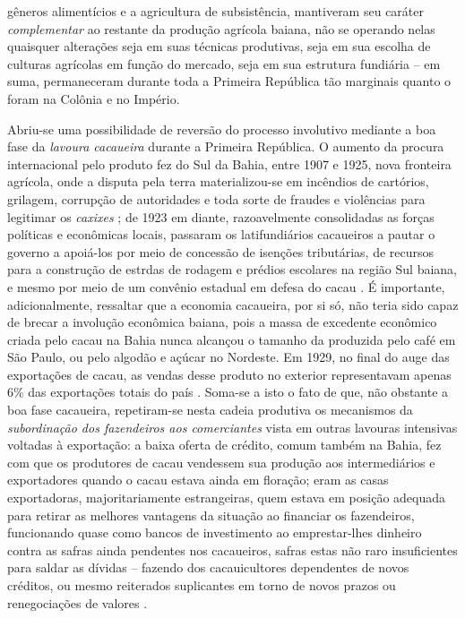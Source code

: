 gêneros alimentícios e a agricultura de subsistência, mantiveram seu caráter \textit{complementar} ao restante da produção agrícola baiana, não se operando nelas quaisquer alterações seja em suas técnicas produtivas, seja em sua escolha de culturas agrícolas em função do mercado, seja em sua estrutura fundiária -- em suma, permaneceram durante toda a Primeira República tão marginais quanto o foram na Colônia e no Império. 

Abriu-se uma possibilidade de reversão do processo involutivo mediante a boa fase da \textit{lavoura cacaueira} durante a Primeira República. O aumento da procura internacional pelo produto fez do Sul da Bahia, entre 1907 e 1925, nova fronteira agrícola, onde a disputa pela terra materializou-se em incêndios de cartórios, grilagem, corrupção de autoridades e toda sorte de fraudes e violências para legitimar os \textit{caxixes} \cite[pp.~78-79]{CPE1980}; de 1923 em diante, razoavelmente consolidadas as forças políticas e econômicas locais, passaram os latifundiários cacaueiros a pautar o governo a apoiá-los por meio de concessão de isenções tributárias, de recursos para a construção de estrdas de rodagem e prédios escolares na região Sul baiana, e mesmo por meio de um convênio estadual em defesa do cacau \cite[p.~77]{sampaio_legislativo_1985}. É importante, adicionalmente, ressaltar que a economia cacaueira, por si só, não teria sido capaz de brecar a involução econômica baiana, pois a massa de excedente econômico criada pelo cacau na Bahia nunca alcançou o tamanho da produzida pelo café em São Paulo, ou pelo algodão e açúcar no Nordeste. Em 1929, no final do auge das exportações de cacau, as vendas desse produto no exterior representavam apenas 6\% das exportações totais do país \cite[p.~20]{CPE1980}. Soma-se a isto o fato de que, não obstante a boa fase cacaueira, repetiram-se nesta cadeia produtiva os mecanismos da \textit{subordinação dos fazendeiros aos comerciantes} vista em outras lavouras intensivas voltadas à exportação: a baixa oferta de crédito, comum também na Bahia, fez com que os produtores de cacau vendessem sua produção aos intermediários e exportadores quando o cacau estava ainda em floração; eram as casas exportadoras, majoritariamente estrangeiras, quem estava em posição adequada para retirar as melhores vantagens da situação ao financiar os fazendeiros, funcionando quase como bancos de investimento ao emprestar-lhes dinheiro contra as safras ainda pendentes nos cacaueiros, safras estas não raro insuficientes para saldar as dívidas -- fazendo dos cacauicultores dependentes de novos créditos, ou mesmo reiterados suplicantes em torno de novos prazos ou renegociações de valores \cite[p.~229]{perissinotto_cladom_1994}. 

